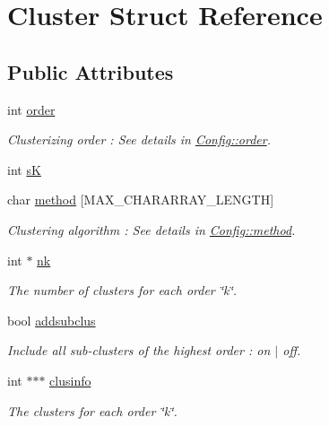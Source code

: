 \hypertarget{structCluster}{\section{Cluster Struct Reference}
\label{structCluster}
}
\subsection*{Public Attributes}
\begin{DoxyCompactItemize}
\item 
\hypertarget{structCluster_ae77394af156e2e278a34f12e83d66cb7}{int \hyperlink{structCluster_ae77394af156e2e278a34f12e83d66cb7}{order}}\label{structCluster_ae77394af156e2e278a34f12e83d66cb7}

\begin{DoxyCompactList}\small\item\em Clusterizing order \-: See details in \hyperlink{structConfig_a3a9071ea9a9409cefb8cbcea2184c879}{Config\-::order}. \end{DoxyCompactList}\item 
int \hyperlink{structCluster_a7c4d583750b7f37eb2ca537e23ad334f}{s\-K}
\item 
\hypertarget{structCluster_acfc81556c4ed78e0bce4c36119fe7150}{char \hyperlink{structCluster_acfc81556c4ed78e0bce4c36119fe7150}{method} \mbox{[}M\-A\-X\-\_\-\-C\-H\-A\-R\-A\-R\-R\-A\-Y\-\_\-\-L\-E\-N\-G\-T\-H\mbox{]}}\label{structCluster_acfc81556c4ed78e0bce4c36119fe7150}

\begin{DoxyCompactList}\small\item\em Clustering algorithm \-: See details in \hyperlink{structConfig_a73d927bf5bdb0f39d024b23dc66f0c1c}{Config\-::method}. \end{DoxyCompactList}\item 
int $\ast$ \hyperlink{structCluster_a1385a76b03a7f2f862526ff2bf449755}{nk}
\begin{DoxyCompactList}\small\item\em The number of clusters for each order \char`\"{}k\char`\"{}. \end{DoxyCompactList}\item 
bool \hyperlink{structCluster_a33621fac416bdd2eea40805e74730748}{addsubclus}
\begin{DoxyCompactList}\small\item\em Include all sub-\/clusters of the highest order \-: on $|$ off. \end{DoxyCompactList}\item 
int $\ast$$\ast$$\ast$ \hyperlink{structCluster_afd65bde6cf52f123d1d1ab7a3fd9805c}{clusinfo}
\begin{DoxyCompactList}\small\item\em The clusters for each order \char`\"{}k\char`\"{}. \end{DoxyCompactList}\end{DoxyCompactItemize}


